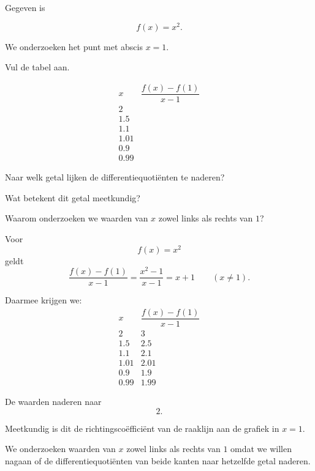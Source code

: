 \documentclass{ximera}
\begin{document}
\begin{oefening}{\oefU\ESS}

Gegeven is

\[
f(x)=x^2.
\]

We onderzoeken het punt met abscis $x=1$.

Vul de tabel aan.

\[
\begin{array}{c|c}
x &
\dfrac{f(x)-f(1)}{x-1}
\\ \hline
2 & \\
1.5 & \\
1.1 & \\
1.01 & \\
0.9 & \\
0.99 &
\end{array}
\]

\begin{question}
Naar welk getal lijken de differentiequotiënten te naderen?
\end{question}

\begin{question}
Wat betekent dit getal meetkundig?
\end{question}

\begin{question}
Waarom onderzoeken we waarden van $x$ zowel links als rechts van $1$?
\end{question}

\begin{oplossing}

Voor
\[
f(x)=x^2
\]
geldt
\[
\frac{f(x)-f(1)}{x-1}
=
\frac{x^2-1}{x-1}
=
x+1
\qquad (x\neq1).
\]

Daarmee krijgen we:
\[
\begin{array}{c|c}
x & \dfrac{f(x)-f(1)}{x-1}\\ \hline
2 & 3\\
1.5 & 2.5\\
1.1 & 2.1\\
1.01 & 2.01\\
0.9 & 1.9\\
0.99 & 1.99
\end{array}
\]

De waarden naderen naar
\[
\boxed{2}.
\]

Meetkundig is dit de richtingscoëfficiënt van de raaklijn aan de grafiek
in $x=1$.

We onderzoeken waarden van $x$ zowel links als rechts van $1$ omdat we
willen nagaan of de differentiequotiënten van beide kanten naar hetzelfde
getal naderen.

\end{oplossing}

\end{oefening}
\end{document}
